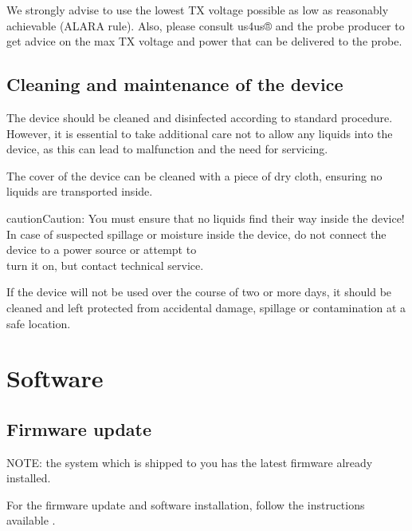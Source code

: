 \documentclass[letterpaper,10pt,english]{sphinxmanual}
\begin{document}
\sphinxAtStartPar
We strongly advise to use the lowest TX voltage possible \textendash{} as low as
reasonably achievable (ALARA rule). Also, please consult us4us® and the
probe producer to get advice on the max TX voltage and power that can be
delivered to the probe.


\section{Cleaning and maintenance of the device}
\label{\detokenize{content/hardware:cleaning-and-maintenance-of-the-device}}
\sphinxAtStartPar
The  device should be cleaned and disinfected according to
standard procedure. However, it is essential to take additional care not
to allow any liquids into the device, as this can lead to malfunction
and the need for servicing.

\sphinxAtStartPar
The cover of the device can be cleaned with a piece of dry cloth,
ensuring no liquids are transported inside.

\begin{sphinxadmonition}{caution}{Caution:}
\sphinxAtStartPar
You must ensure that no liquids find their way inside the device!
In case of suspected spillage or moisture inside the device,
do not connect the device to a power source or attempt to\\
turn it on, but contact technical service.
\end{sphinxadmonition}

\sphinxAtStartPar
If the device will not be used over the course of two or more days, it
should be cleaned and left protected from accidental damage, spillage or
contamination at a safe location.

\sphinxstepscope


\chapter{Software}
\label{\detokenize{content/software:software}}\label{\detokenize{content/software::doc}}

\section{Firmware update}
\label{\detokenize{content/software:firmware-update}}
\sphinxAtStartPar
NOTE: the  system which is shipped to you has the latest
firmware already installed.

\sphinxAtStartPar
For the firmware update and software installation, follow the instructions available
.
\end{document}
